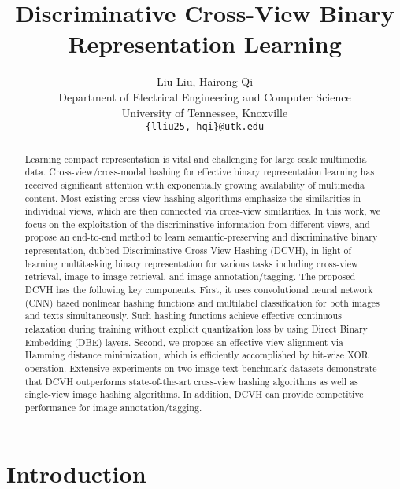 \documentclass[10pt,twocolumn,letterpaper]{article}
\begin{document}
\title{Discriminative Cross-View Binary Representation Learning}

\author{Liu Liu, Hairong Qi\\
Department of Electrical Engineering and Computer Science\\
University of Tennessee, Knoxville\\
{\tt\small \{lliu25, hqi\}@utk.edu}
}

\maketitle
\ifwacvfinal\thispagestyle{empty}\fi

\begin{abstract}
Learning compact representation is vital and challenging for large scale multimedia data. Cross-view/cross-modal hashing for effective binary representation learning has received significant attention with exponentially growing availability of multimedia content. Most existing cross-view hashing algorithms emphasize the similarities in individual views, which are then connected via cross-view similarities. 
In this work, we focus on the exploitation of the discriminative information from different views, and propose an end-to-end method to learn semantic-preserving and discriminative binary representation, dubbed Discriminative Cross-View Hashing (DCVH), in light of learning multitasking binary representation for various tasks including cross-view retrieval, image-to-image retrieval, and image annotation/tagging. 
The proposed DCVH has the following key components. First, it uses convolutional neural network (CNN) based nonlinear hashing functions and multilabel classification for both images and texts simultaneously. Such hashing functions achieve effective continuous relaxation during training without explicit quantization loss by using Direct Binary Embedding (DBE) layers. Second, we propose an effective view alignment via Hamming distance minimization, which is efficiently accomplished by bit-wise XOR operation. Extensive experiments on two image-text benchmark datasets demonstrate that DCVH outperforms state-of-the-art cross-view hashing algorithms as well as single-view image hashing algorithms. In addition, DCVH can provide competitive performance for image annotation/tagging. 
\end{abstract}

\section{Introduction}
\end{document}
